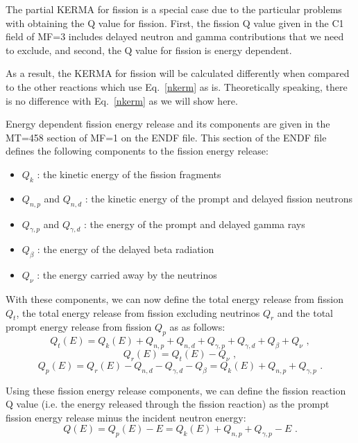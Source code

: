 The partial KERMA for fission is a special case due to the particular
problems with obtaining the Q value for fission.
First, the fission Q value given in the C1 field of MF=3 includes
delayed neutron and gamma contributions that we need to exclude,
and second, the Q value for fission is energy dependent.

As a result, the KERMA for fission will be calculated differently
when compared to the other reactions which use Eq.~\ref{nkerm} as is.
Theoretically speaking, there is no difference with Eq.~\ref{nkerm}
as we will show here.

Energy dependent fission energy release and its components are given
in the MT=458 section of MF=1 on the ENDF file. This section of the
ENDF file defines the following components to the fission energy release:
\begin{itemize}
\item $Q_k$ : the kinetic energy of the fission fragments
\item $Q_{n,p}$ and $Q_{n,d}$ : the kinetic energy of the prompt and
      delayed fission neutrons
\item $Q_{\gamma,p}$ and $Q_{\gamma,d}$ : the energy of the prompt
      and delayed gamma rays
\item $Q_{\beta}$ : the energy of the delayed beta radiation
\item $Q_{\nu}$ : the energy carried away by the neutrinos
\end{itemize}

With these components, we can now define the total energy release
from fission $Q_t$, the total energy release from fission excluding
neutrinos $Q_r$ and the total prompt energy release from fission
$Q_p$ as as follows:
\begin{equation}
   Q_t(E) = Q_k(E) + Q_{n,p} + Q_{n,d} + Q_{\gamma,p} + Q_{\gamma,d}
          + Q_{\beta} + Q_{\nu}\,\,,
\end{equation}
\begin{equation}
   Q_r(E) = Q_t(E) - Q_{\nu}\,\,,
\end{equation}
\begin{equation}
   Q_p(E) = Q_r(E) - Q_{n,d} - Q_{\gamma,d} - Q_{\beta}
          = Q_k(E) + Q_{n,p} + Q_{\gamma,p}\,\,.
\end{equation}

Using these fission energy release components, we can define the
fission reaction Q value (i.e. the energy released through the fission
reaction) as the prompt fission energy release minus the incident
neutron energy:
\begin{equation}
   Q(E) = Q_p(E) - E
        = Q_k(E) + Q_{n,p} + Q_{\gamma,p} - E\,\,.
\end{equation}

